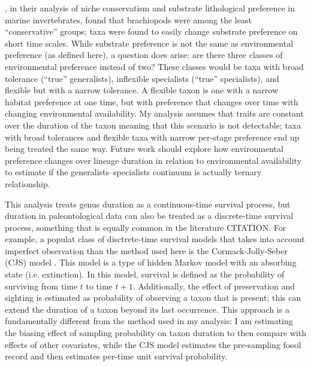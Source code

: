 \documentclass[11pt]{article}
\begin{document}
\citet{Hopkins2014a}, in their analysis of niche conservatism and substrate lithological preference in marine invertebrates, found that brachiopods were among the least ``conservative'' groups; taxa were found to easily change substrate preference on short time scales. While substrate preference is not the same as environmental preference (as defined here), a question does arise: are there three classes of environmental preference instead of two? These classes would be taxa with broad tolerance (``true'' generalists), inflexible specialists (``true'' specialists), and flexible but with a narrow tolerance. A flexible taxon is one with a narrow habitat preference at one time, but with preference that changes over time with changing environmental availability. My analysis assumes that traits are constant over the duration of the taxon meaning that this scenario is not detectable; taxa with broad tolerances and flexible taxa with narrow per-stage preference end up being treated the same way. Future work should explore how environmental preference changes over lineage duration in relation to environmental availability to estimate if the generalists--specialists continuum is actually ternary relationship.

This analysis treats genus duration as a continuous-time survival process, but duration in paleontological data can also be treated as a discrete-time survival process, something that is equally common in the literature CITATION. For example, a populat class of disctrete-time survival models that takes into account imperfect observation than the method used here is the Cormack-Jolly-Seber (CJS) model \citep{Royle2008,Liow2008,Tomiya2013,Liow2010b}. This model is a type of hidden Markov model with an absorbing state (i.e. extinction). In this model, survival is defined as the probability of surviving from time \(t\) to time \(t + 1\). Additionally, the effect of preservation and sighting is estimated as probability of observing a taxon that is present; this can extend the duration of a taxon beyond its last occurrence. This approach is a fundamentally different from the method used in my analysis: I am estimating the biasing effect of sampling probability on taxon duration to then compare with effects of other covariates, while the CJS model estimates the pre-sampling fossil record and then estimates per-time unit survival probability.
\end{document}

